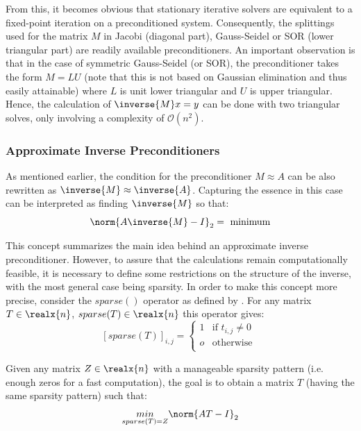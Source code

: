 \noindent From this, it becomes obvious that stationary iterative solvers are equivalent to a fixed-point iteration on a preconditioned system. Consequently, the splittings used for the matrix $M$ in Jacobi (diagonal part), Gauss-Seidel or SOR (lower triangular part) are readily available preconditioners. An important observation is that in the case of symmetric Gauss-Seidel (or SOR), the preconditioner takes the form $M=LU$ (note that this is not based on Gaussian elimination and thus easily attainable) where $L$ is unit lower triangular and $U$ is upper triangular. Hence, the calculation of $\inverse{M}x=y$ can be done with two triangular solves, only involving a complexity of $\mathcal{O}(n^2)$.

\subsubsection{Approximate Inverse Preconditioners}
\label{sec:inverse_preconditioners}
As mentioned earlier, the condition for the preconditioner $M \approx A$ can be also rewritten as $\inverse{M} \approx \inverse{A}$. Capturing the essence in this case can be interpreted as finding $\inverse{M}$ so that:
\begin{equation}
    \norm{A\inverse{M}-I}_2 = \text{ minimum}
\end{equation}

\noindent This concept summarizes the main idea behind an approximate inverse preconditioner. However, to assure that the calculations remain computationally feasible, it is necessary to define some restrictions on the structure of the inverse, with the most general case being sparsity. In order to make this concept more precise, consider the $sparse()$ operator as defined by \cite{golub_matrix_2013}. For any matrix $T \in \realx{n}$, $sparse(T) \in \realx{n}$ this operator gives:
\begin{equation}
    \left[ sparse(T)\right]_{i,j} =\begin{cases}
      1 & \text{if } t_{i,j} \neq 0\\
      o & \text{otherwise }\\
    \end{cases}  
\end{equation}

\noindent Given any matrix $Z \in \realx{n}$ with a manageable sparsity pattern (i.e. enough zeros for a fast computation), the goal is to obtain a matrix $T$ (having the same sparsity pattern) such that:
\begin{equation}
    \underset{sparse(T)=Z}{min} \norm{AT-I}_2
\end{equation}

